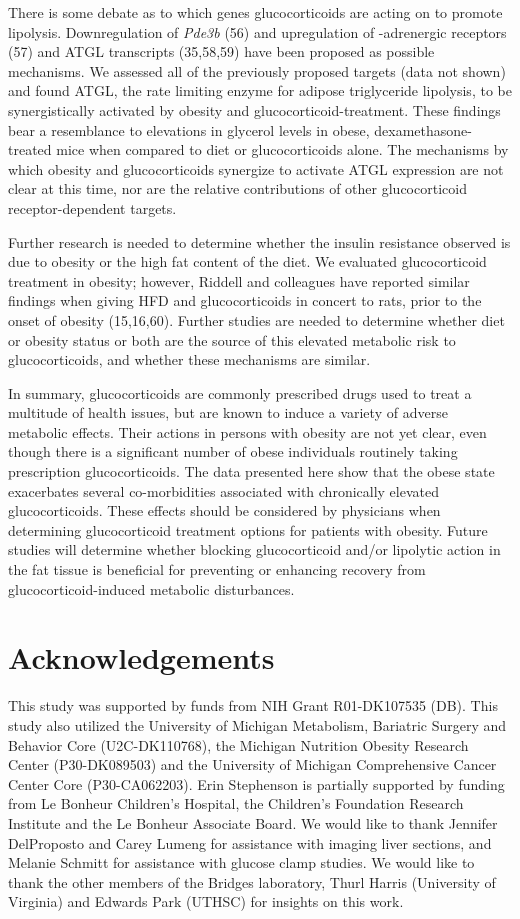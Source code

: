 \documentclass[11pt]{article} %
\begin{document}
There is some debate as to which genes glucocorticoids are acting on to
promote lipolysis. Downregulation of \emph{Pde3b} (56) and upregulation
of -adrenergic receptors (57) and ATGL transcripts (35,58,59) have been
proposed as possible mechanisms. We assessed all of the previously
proposed targets (data not shown) and found ATGL, the rate limiting
enzyme for adipose triglyceride lipolysis, to be synergistically
activated by obesity and glucocorticoid-treatment. These findings bear a
resemblance to elevations in glycerol levels in obese,
dexamethasone-treated mice when compared to diet or glucocorticoids
alone. The mechanisms by which obesity and glucocorticoids synergize to
activate ATGL expression are not clear at this time, nor are the
relative contributions of other glucocorticoid receptor-dependent
targets.

Further research is needed to determine whether the insulin resistance
observed is due to obesity or the high fat content of the diet. We
evaluated glucocorticoid treatment in obesity; however, Riddell and
colleagues have reported similar findings when giving HFD and
glucocorticoids in concert to rats, prior to the onset of obesity
(15,16,60). Further studies are needed to determine whether diet or
obesity status or both are the source of this elevated metabolic risk to
glucocorticoids, and whether these mechanisms are similar.

In summary, glucocorticoids are commonly prescribed drugs used to treat
a multitude of health issues, but are known to induce a variety of
adverse metabolic effects. Their actions in persons with obesity are not
yet clear, even though there is a significant number of obese
individuals routinely taking prescription glucocorticoids. The data
presented here show that the obese state exacerbates several
co-morbidities associated with chronically elevated glucocorticoids.
These effects should be considered by physicians when determining
glucocorticoid treatment options for patients with obesity. Future
studies will determine whether blocking glucocorticoid and/or lipolytic
action in the fat tissue is beneficial for preventing or enhancing
recovery from glucocorticoid-induced metabolic disturbances.

\section*{Acknowledgements}\label{acknowledgements}

This study was supported by funds from NIH Grant R01-DK107535 (DB). This
study also utilized the University of Michigan Metabolism, Bariatric
Surgery and Behavior Core (U2C-DK110768), the Michigan Nutrition Obesity
Research Center (P30-DK089503) and the University of Michigan
Comprehensive Cancer Center Core (P30-CA062203). Erin Stephenson is
partially supported by funding from Le Bonheur Children's Hospital, the
Children's Foundation Research Institute and the Le Bonheur Associate
Board. We would like to thank Jennifer DelProposto and Carey Lumeng for
assistance with imaging liver sections, and Melanie Schmitt for
assistance with glucose clamp studies. We would like to thank the other
members of the Bridges laboratory, Thurl Harris (University of Virginia)
and Edwards Park (UTHSC) for insights on this work.
\end{document}
